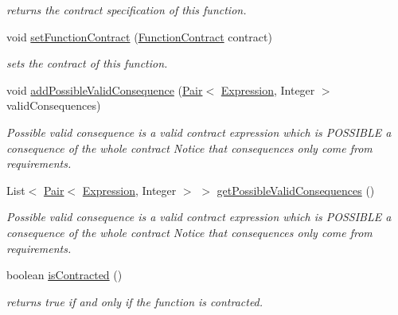 \begin{DoxyCompactItemize}
\begin{DoxyCompactList}\small\item\em returns the contract specification of this function. \end{DoxyCompactList}\item 
void \hyperlink{classedu_1_1udel_1_1cis_1_1vsl_1_1civl_1_1model_1_1common_1_1CommonFunction_a701d7d3985b48bed10bed29141179a68}{set\+Function\+Contract} (\hyperlink{interfaceedu_1_1udel_1_1cis_1_1vsl_1_1civl_1_1model_1_1IF_1_1contract_1_1FunctionContract}{Function\+Contract} contract)
\begin{DoxyCompactList}\small\item\em sets the contract of this function. \end{DoxyCompactList}\item 
void \hyperlink{classedu_1_1udel_1_1cis_1_1vsl_1_1civl_1_1model_1_1common_1_1CommonFunction_aac52d70d4d8ae6d289d1e2fee4d71138}{add\+Possible\+Valid\+Consequence} (\hyperlink{classedu_1_1udel_1_1cis_1_1vsl_1_1civl_1_1util_1_1IF_1_1Pair}{Pair}$<$ \hyperlink{interfaceedu_1_1udel_1_1cis_1_1vsl_1_1civl_1_1model_1_1IF_1_1expression_1_1Expression}{Expression}, Integer $>$ valid\+Consequences)
\begin{DoxyCompactList}\small\item\em Possible valid consequence is a valid contract expression which is P\+O\+S\+S\+I\+B\+L\+E a consequence of the whole contract Notice that consequences only come from requirements. \end{DoxyCompactList}\item 
List$<$ \hyperlink{classedu_1_1udel_1_1cis_1_1vsl_1_1civl_1_1util_1_1IF_1_1Pair}{Pair}$<$ \hyperlink{interfaceedu_1_1udel_1_1cis_1_1vsl_1_1civl_1_1model_1_1IF_1_1expression_1_1Expression}{Expression}, Integer $>$ $>$ \hyperlink{classedu_1_1udel_1_1cis_1_1vsl_1_1civl_1_1model_1_1common_1_1CommonFunction_a61cba1b046a548ae043fc87a1cf1ae7d}{get\+Possible\+Valid\+Consequences} ()
\begin{DoxyCompactList}\small\item\em Possible valid consequence is a valid contract expression which is P\+O\+S\+S\+I\+B\+L\+E a consequence of the whole contract Notice that consequences only come from requirements. \end{DoxyCompactList}\item 
boolean \hyperlink{classedu_1_1udel_1_1cis_1_1vsl_1_1civl_1_1model_1_1common_1_1CommonFunction_a86b059487665dd995f402dc3cb6ba520}{is\+Contracted} ()
\begin{DoxyCompactList}\small\item\em returns true if and only if the function is contracted. \end{DoxyCompactList}\item 

\end{DoxyCompactItemize}

